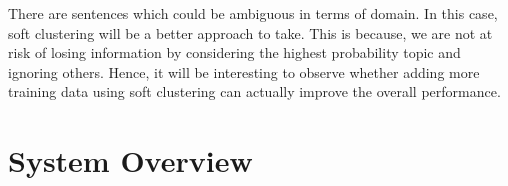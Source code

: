 {There are sentences which could be ambiguous in terms of domain. In this case, soft clustering will be a better approach to take. This is because, we are not at risk of losing information by considering the highest probability topic and ignoring others. Hence, it will be interesting to observe whether adding more training data using soft clustering can actually improve the overall performance. 



}








 

\section{System Overview}\label{sec:setup}

